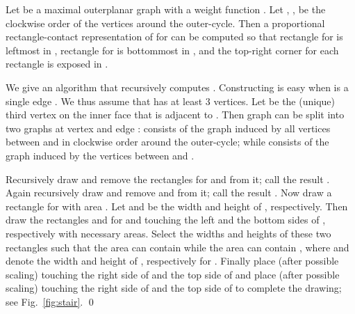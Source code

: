 \documentclass{llncs}
\renewenvironment{proof}{\medskip\noindent{\bf Proof:}}{\mbox{}\hfill\qed\par}
\newenvironment{sketch}{\medskip\noindent{\bf Proof Sketch:}}{\mbox{}\hfill\qed\par}
\begin{document}
\begin{lemma}
\label{lem:stair}
	Let  be a maximal outerplanar graph with a weight function . Let
	, ,  be the clockwise order of the vertices around the
	outer-cycle. Then a proportional rectangle-contact representation  of
	 for  can be computed so that rectangle 
	for  is leftmost in , rectangle  for  is
        bottommost in , and the top-right corner for each rectangle is exposed in .
\end{lemma}
\begin{comment}
	\begin{figure}[t]
\centering
		\texttt{[image: stair.pdf]}
		\caption{Illustration for the proof of Lemma~\ref{lem:stair}.}
	\label{fig:stair}
	\end{figure}
\begin{sketch}
Constructing  is easy when  is a single edge , so
let  contain at least 3 vertices. Let  be the unique vertex adjacent to . Denote by
  the graph induced by all vertices between  and  and by  the graph
 induced by the vertices between  and . Recursively draw  and  and
 remove the rectangles for , ,  to find the drawings  and ,
 respectively. Finally draw the rectangles ,  and  for ,  and ,
 with the required areas and place  (after possible scaling) between
 ,  and  (after possible scaling)  between ,  to complete
 the drawing; see Fig.~\ref{fig:stair}.
\end{sketch}
\end{comment}


\begin{proof}
We give an algorithm that recursively computes . Constructing  is easy
 when  is a single edge . We thus assume that  has at least 3 vertices. Let 
 be the (unique) third vertex on the inner face that is adjacent to . Then graph  can
 be split into two graphs at vertex  and edge :  consists of the graph induced
 by all vertices between  and  in clockwise order around the outer-cycle; while 
 consists of the graph induced by the vertices between  and .





Recursively draw  and remove the rectangles for  and  from it; call the result
 . Again recursively draw  and remove  and  from it; call the result
 . Now draw a rectangle  for  with area . Let  and  be
 the width and height of , respectively. Then draw the rectangles  and  for
  and  touching the left and the bottom sides of , respectively with necessary areas.
 Select the widths and heights of these two rectangles such that the area 
 can contain  while the area  can contain , where
  and  denote the width and height of , respectively for . Finally
 place  (after possible scaling) touching the right side of  and the top side
 of  and place  (after possible scaling) touching the right side of  and
 the top side of  to complete the drawing; see Fig.~\ref{fig:stair}.
\end{proof}
\end{document}
